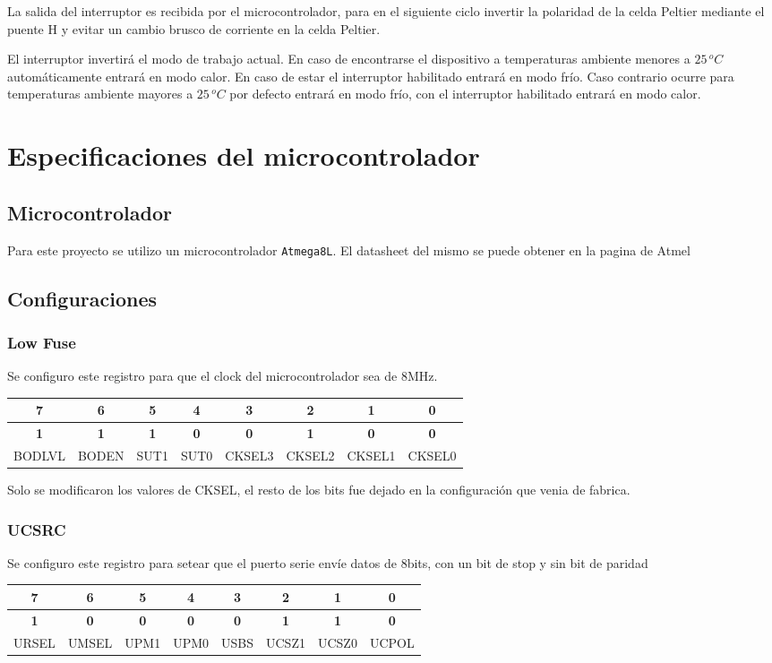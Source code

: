 \documentclass[10pt,spanish,a4paper,openany,notitlepage]{article}
\begin{document}
La salida del interruptor es recibida por el microcontrolador, para en 
el siguiente ciclo invertir la polaridad de la celda Peltier mediante el puente H y
evitar un cambio brusco de corriente en la celda Peltier.

El interruptor invertirá el modo de trabajo actual. En caso de encontrarse el dispositivo a temperaturas ambiente menores a $25\, \unit{^oC}$
automáticamente entrará en modo calor. En caso de estar el interruptor habilitado entrará en modo frío. Caso contrario ocurre
para temperaturas ambiente mayores a $25\, \unit{^oC}$ por defecto entrará en modo frío, con el interruptor habilitado entrará en modo calor.

\section{Especificaciones del microcontrolador}

\subsection{Microcontrolador}
Para este proyecto se utilizo un microcontrolador \texttt{Atmega8L}. El datasheet del mismo se puede obtener en la pagina de Atmel\cite{datasheet}
\subsection{Configuraciones}
\subsubsection{Low Fuse}
Se configuro este registro para que el clock del microcontrolador sea de 8MHz. 
\begin{center}
\begin{tabular}{|c|c|c|c|c|c|c|c|}\hline
7&6&5&4&3&2&1&0\\\hline
\textbf{1}&\textbf{1}&\textbf{1}&\textbf{0}&\textbf{0}&\textbf{1}&\textbf{0}&\textbf{0}\\\hline
BODLVL&BODEN&SUT1&SUT0&CKSEL3&CKSEL2&CKSEL1&CKSEL0\\\hline
\end{tabular}
\end{center}
Solo se modificaron los valores de CKSEL, el resto de los bits fue dejado en la configuración que venia de fabrica.

\subsubsection{UCSRC}\label{UCSRC}
Se configuro este registro para setear que el puerto serie envíe datos de 8bits, con un bit de stop y sin bit de paridad
\begin{center}
\begin{tabular}{|c|c|c|c|c|c|c|c|}\hline
7&6&5&4&3&2&1&0\\\hline
\textbf{1}&\textbf{0}&\textbf{0}&\textbf{0}&\textbf{0}&\textbf{1}&\textbf{1}&\textbf{0}\\\hline
URSEL&UMSEL&UPM1&UPM0&USBS&UCSZ1&UCSZ0&UCPOL\\\hline
\end{tabular}
\end{center}
\end{document}
